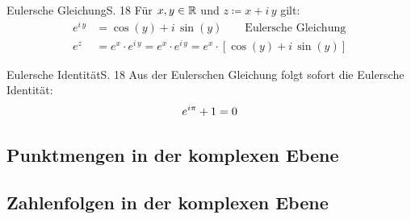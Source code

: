 \begin{bemerkung}{Eulersche Gleichung}{S. 18}
  Für $x, y \in \mathbb{R}$ und $z \coloneqq x + i\,y$ gilt:
  \begin{align}
    e^{i\,y} &= \cos(y) + i \, \sin(y) \qquad \text{Eulersche Gleichung}\\
    e^z &= e^x \cdot e^{i \, y} = e^x \cdot e^{i \, y} = e^x \cdot \left[ \cos(y) + i \, \sin(y) \right]
  \end{align}
\end{bemerkung}

\begin{bemerkung}{Eulersche Identität}{S. 18}
  Aus der Eulerschen Gleichung folgt sofort die Eulersche Identität:
  {
    \Huge
    \begin{align}
      e^{i\pi} + 1 = 0 \notag
    \end{align}
  }
\end{bemerkung}



\subsection{Punktmengen in der komplexen Ebene}

\subsection{Zahlenfolgen in der komplexen Ebene}
